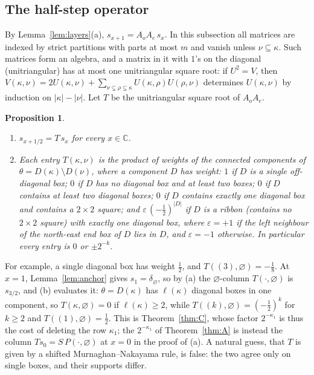 \documentclass[11pt]{amsart}
\newtheorem{proposition}[theorem]{Proposition}
\theoremstyle{definition}
\theoremstyle{remark}
\newcommand{\C}{\mathbb{C}}
\begin{document}
\subsection{The half-step operator}\label{ssec:halfstep}
By Lemma~\ref{lem:layers}(a), $s_{x+1}=A_oA_e\,s_x$. In this subsection all matrices are
indexed by strict partitions with parts at most $m$ and vanish unless $\nu\subseteq\kappa$.
Such matrices form an algebra, and a matrix in it with $1$'s on the diagonal (unitriangular)
has at most one unitriangular square root: if $U^2=V$, then
$V(\kappa,\nu)=2U(\kappa,\nu)+\sum_{\nu\subsetneq\rho\subsetneq\kappa}U(\kappa,\rho)U(\rho,\nu)$
determines $U(\kappa,\nu)$ by induction on $|\kappa|-|\nu|$. Let $T$ be the unitriangular
square root of $A_oA_e$.

\begin{proposition}\label{prop:T}
\begin{enumerate}[label=(\alph*)]
\item $s_{x+1/2}=T\,s_x$ for every $x\in\C$.
\item Each entry $T(\kappa,\nu)$ is the product of weights of the connected components of
$\theta=D(\kappa)\setminus D(\nu)$, where a component $D$ has weight: $1$ if $D$ is a single
off-diagonal box; $0$ if $D$ has no diagonal box and at least two boxes; $0$ if $D$ contains at
least two diagonal boxes; $0$ if $D$ contains exactly one diagonal box and contains a $2\times2$
square; and $\varepsilon\,(-\tfrac12)^{|D|}$ if $D$ is a ribbon (contains no $2\times2$ square)
with exactly one diagonal box, where $\varepsilon=+1$ if the left neighbour of the north-east
end box of $D$ lies in $D$, and $\varepsilon=-1$ otherwise. In particular every entry is $0$
or $\pm2^{-k}$.
\end{enumerate}
\end{proposition}

For example, a single diagonal box has weight $\tfrac12$, and $T((3),\varnothing)=-\tfrac18$.
At $x=1$, Lemma~\ref{lem:anchor} gives $s_1=\delta_\varnothing$, so by (a) the $\varnothing$-column
$T(\cdot,\varnothing)$ is $s_{3/2}$, and (b) evaluates it: $\theta=D(\kappa)$ has $\ell(\kappa)$
diagonal boxes in one component, so $T(\kappa,\varnothing)=0$ if $\ell(\kappa)\ge2$, while
$T((k),\varnothing)=(-\tfrac12)^k$ for $k\ge2$ and $T((1),\varnothing)=\tfrac12$. This is
Theorem~\ref{thm:C}, whose factor $2^{-\kappa_1}$ is thus the cost of deleting the row $\kappa_1$;
the $2^{-\kappa_1}$ of Theorem~\ref{thm:A} is instead the column $Ts_0=S\,P(\cdot,\varnothing)$
at $x=0$ in the proof of (a).
A natural guess, that $T$ is given by a shifted Murnaghan--Nakayama rule, is false: the two agree
only on single boxes, and their supports differ.
\end{document}
